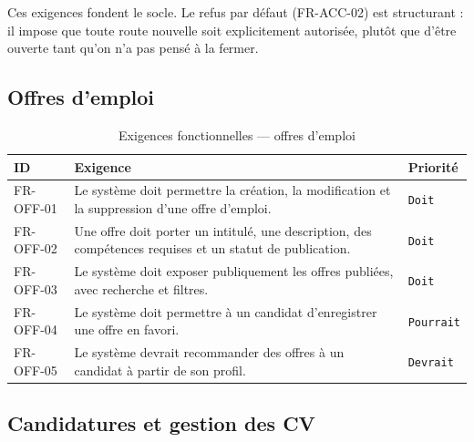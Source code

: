 Ces exigences fondent le socle. Le refus par défaut (FR-ACC-02) est structurant :
il impose que toute route nouvelle soit explicitement autorisée, plutôt que
d'être ouverte tant qu'on n'a pas pensé à la fermer.

\subsection{Offres d'emploi}
\label{sec:fr_offers}

\begin{table}[htbp]
  \centering
  \caption{Exigences fonctionnelles — offres d'emploi}
  \label{tab:fr_offers}
  \begin{tabularx}{\textwidth}{L{2.4cm} X L{1.9cm}}
    \toprule
    \textbf{ID} & \textbf{Exigence} & \textbf{Priorité} \\
    \midrule
    FR-OFF-01 & Le système doit permettre la création, la modification et la suppression d'une offre d'emploi. & \texttt{Doit} \\
    FR-OFF-02 & Une offre doit porter un intitulé, une description, des compétences requises et un statut de publication. & \texttt{Doit} \\
    FR-OFF-03 & Le système doit exposer publiquement les offres publiées, avec recherche et filtres. & \texttt{Doit} \\
    FR-OFF-04 & Le système doit permettre à un candidat d'enregistrer une offre en favori. & \texttt{Pourrait} \\
    FR-OFF-05 & Le système devrait recommander des offres à un candidat à partir de son profil. & \texttt{Devrait} \\
    \bottomrule
  \end{tabularx}
\end{table}

\subsection{Candidatures et gestion des CV}
\label{sec:fr_applications}

